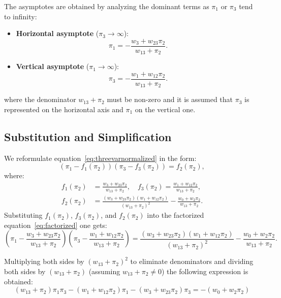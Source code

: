 \documentclass[
	11pt, %
	fleqn, %
	a4paper, %
]{LegrandOrangeBook}
\begin{document}
The asymptotes are obtained by analyzing the dominant terms as $\pi_1$ or $\pi_3$ tend to infinity:
\begin{itemize}
\item \textbf{Horizontal asymptote} ($\pi_3 \to \infty$):
\begin{equation}
\pi_1 = -\frac{w_3 + w_{23}\pi_2}{w_{13} + \pi_2}.
\end{equation}

\item \textbf{Vertical asymptote} ($\pi_1 \to \infty$):
\begin{equation}
\pi_3 = -\frac{w_1 + w_{12}\pi_2}{w_{13} + \pi_2}.
\end{equation}
\end{itemize}

where the denominator $w_{13} + \pi_2$ must be non-zero and it is assumed that $\pi_3$ is represented on the horizontal axis and $\pi_1$ on the vertical one.
\subsection{Substitution and Simplification}
We reformulate equation~\eqref{eq:threevarnormalized} in the form:
\begin{equation}
(\pi_1 - f_1(\pi_2))(\pi_3 - f_3(\pi_2)) = f_2(\pi_2),
\label{eq:factorized}
\end{equation}
where:
\begin{align}
f_1(\pi_2) &= \frac{w_3 + w_{23}\pi_2}{w_{13} + \pi_2}, \quad f_3(\pi_2) = \frac{w_1 + w_{12}\pi_2}{w_{13} + \pi_2}, \\
f_2(\pi_2) &= \frac{(w_3 + w_{23}\pi_2)(w_1 + w_{12}\pi_2)}{(w_{13} + \pi_2)^2} - \frac{w_0 + w_2\pi_2}{w_{13} + \pi_2}.
\end{align}
Substituting $f_1(\pi_2)$, $f_3(\pi_2)$, and $f_2(\pi_2)$ into the factorized equation~\eqref{eq:factorized} one gets:
\begin{equation}
\boxed{\left(\pi_1 - \frac{w_3 + w_{23}\pi_2}{w_{13} + \pi_2}\right)\left(\pi_3 - \frac{w_1 + w_{12}\pi_2}{w_{13} + \pi_2}\right) = \frac{(w_3 + w_{23}\pi_2)(w_1 + w_{12}\pi_2)}{(w_{13} + \pi_2)^2} - \frac{w_0 + w_2\pi_2}{w_{13} + \pi_2}.}
\label{eq:final
factorized}
\end{equation}

Multiplying both sides by $(w_{13} + \pi_2)^2$ to eliminate denominators and dividing both sides by $(w_{13} + \pi_2)$ (assuming $w_{13} + \pi_2 \neq 0$) the following expression is obtained:
\begin{equation}
(w_{13} + \pi_2)\pi_1\pi_3 - (w_1 + w_{12}\pi_2)\pi_1 - (w_3 + w_{23}\pi_2)\pi_3 = -(w_0 + w_2\pi_2)
\label{eq:expandedform}
\end{equation}
\end{document}
